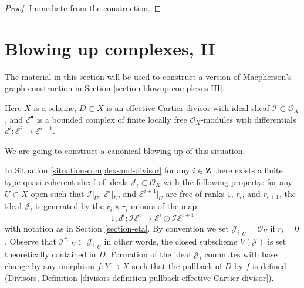 \begin{proof}
Immediate from the construction.
\end{proof}








\section{Blowing up complexes, II}
\label{section-blowup-complexes-II}

\noindent
The material in this section will be used to construct a version of
Macpherson's graph construction in Section \ref{section-blowup-complexes-III}.
 
\begin{situation}
\label{situation-complex-and-divisor}
Here $X$ is a scheme, $D \subset X$ is an effective Cartier divisor
with ideal sheaf $\mathcal{I} \subset \mathcal{O}_X$, and
$\mathcal{E}^\bullet$ is a bounded complex of finite locally free
$\mathcal{O}_X$-modules with differentials
$d^i : \mathcal{E}^i \to \mathcal{E}^{i + 1}$.
\end{situation}

\noindent
We are going to construct a canonical blowing up of this situation.

\begin{remark}
\label{remark-complex-and-divisor-ideal}
In Situation \ref{situation-complex-and-divisor} for any $i \in \mathbf{Z}$
there exists a finite type quasi-coherent sheaf of ideals
$\mathcal{J}_i \subset \mathcal{O}_X$ with the following property:
for any $U \subset X$ open such that $\mathcal{I}|_U$,
$\mathcal{E}^i|_U$, and $\mathcal{E}^{i + 1}|_U$ are
free of ranks $1$, $r_i$, and $r_{i + 1}$, the ideal
$\mathcal{J}_i$ is generated by the $r_i \times r_i$ minors of the map
$$
1, d^i :
\mathcal{I}\mathcal{E}^i
\longrightarrow
\mathcal{E}^i \oplus \mathcal{I}\mathcal{E}^{i + 1}
$$
with notation as in Section \ref{section-eta}. By convention we set
$\mathcal{J}_i|_U = \mathcal{O}_U$ if $r_i = 0$. Observe that
$\mathcal{I}^{r_i}|_U \subset \mathcal{J}_i|_U$ in other words,
the closed subscheme $V(\mathcal{J})$ is set theoretically
contained in $D$. Formation of the
ideal $\mathcal{J}_i$ commutes with base change by any morphism
$f : Y \to X$ such that the pullback of $D$ by $f$ is defined
(Divisors, Definition
\ref{divisors-definition-pullback-effective-Cartier-divisor}).
\end{remark}

